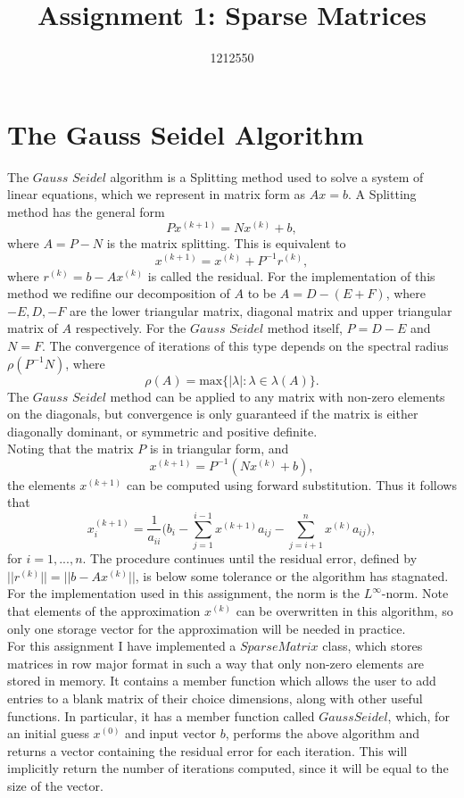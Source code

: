 \documentclass[10pt]{article}
\begin{document}
\title{Assignment 1: Sparse Matrices}
\author{1212550}

\section{The Gauss Seidel Algorithm}
The  $\textit{Gauss Seidel}$  algorithm is a Splitting method used to solve a system of linear equations, which we represent in matrix form as $Ax=b$. A Splitting method has the general form
\[ Px^{(k+1)} = Nx^{(k)} + b, \]
where $A = P - N$ is the matrix splitting. This is equivalent to
\[ x^{(k+1)} = x^{(k)} + P^{-1}r^{(k)}, \]
where $r^{(k)} = b - Ax^{(k)}$ is called the residual. For the implementation of this method we redifine our decomposition of $A$ to be $A = D - (E+F)$, where $-E,D,-F$ are the lower triangular matrix, diagonal matrix and upper triangular matrix of $A$ respectively. For the $\textit{Gauss Seidel}$ method itself, $P = D - E$ and $N = F$. The convergence of iterations of this type depends on the spectral radius $\rho(P^{-1}N)$, where
\[ \rho(A) = \text{max}\{ |\lambda|: \lambda \in \lambda(A) \}. \]
The $\textit{Gauss Seidel}$ method can be applied to any matrix with non-zero elements on the diagonals, but convergence is only guaranteed if the matrix is either diagonally dominant, or symmetric and positive definite. \\

Noting that the matrix $P$ is in triangular form, and
\[ x^{(k+1)} = P^{-1}(Nx^{(k)} + b),\]
the elements $x^{(k+1)}$ can be computed using forward substitution. Thus it follows that
\[ x_i^{(k+1)} = \frac{1}{a_{ii}} \Big( b_i - \sum_{j=1}^{i-1}x^{(k+1)}a_{ij} - \sum_{j=i+1}^{n}x^{(k)}a_{ij} \Big), \]
for $i = 1,...,n$. The procedure continues until the residual error, defined by $||r^{(k)}|| = ||b- A x^{(k)}||$, is below some tolerance or the algorithm has stagnated. For the implementation used in this assignment, the norm is the $L^{\infty}$-norm. Note that elements of the approximation $x^{(k)}$ can be overwritten in this algorithm, so only one storage vector for the approximation will be needed in practice. \\

For this assignment I have implemented a $\textit{SparseMatrix}$ class, which stores matrices in row major format in such a way that only non-zero elements are stored in memory. It contains a member function which allows the user to add entries to a blank matrix of their choice dimensions, along with other useful functions. In particular, it has a member function called $\textit{GaussSeidel}$, which, for an initial guess $x^{(0)}$ and input vector $b$, performs the above algorithm and returns a vector containing the residual error for each iteration. This will implicitly return the number of iterations computed, since it will be equal to the size of the vector.\\
\end{document}
